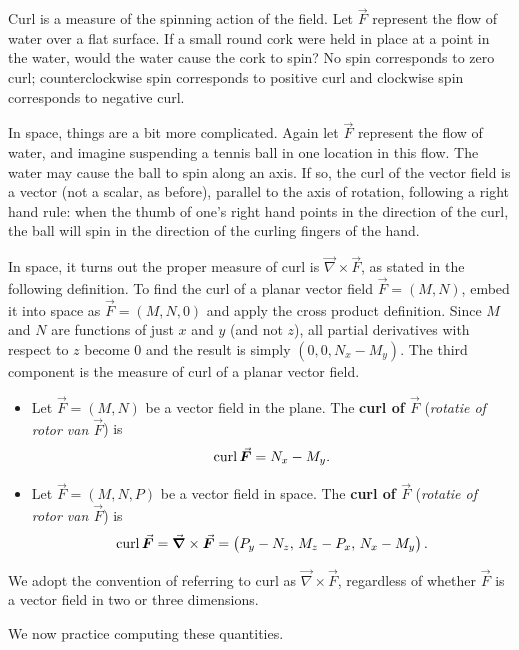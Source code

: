 Curl is a measure of the spinning action of the field. Let $\vec F$ represent the flow of water over a flat surface. If a small round cork were held in place at a point in the water, would the water cause the cork to spin? No spin corresponds to zero curl; counterclockwise spin corresponds to positive curl and clockwise spin corresponds to negative curl. 

In space, things are a bit more complicated. Again let $\vec F$ represent the flow of water, and imagine suspending a tennis ball in one location in this flow. The water may cause the ball to spin along an axis. If so, the curl of the vector field is a vector (not a scalar, as before), parallel to the axis of rotation, following a right hand rule: when the thumb of one's right hand points in the direction of the curl, the ball will spin in the direction of the curling fingers of the hand.

In space, it turns out the proper measure of curl is $\vec{\nabla} \times \vec F$, as stated in the following definition. To find the curl of a planar vector field $\vec F = \left( M,N\right)$, embed it into space as $\vec F = \left( M, N, 0\right)$ and apply the cross product definition. Since $M$ and $N$ are functions of just $x$ and $y$ (and not $z$), all partial derivatives with respect to $z$ become 0 and the result is simply $\left( 0,0,N_x-M_y\right)$. The third component is the measure of curl of a planar vector field. 

\begin{definition}[Curl]\label{def:curl}
\begin{itemize}
	\item Let $\vec F = \left( M,N\right)$ be a vector field in the plane. The \textbf{curl of $\vec F$} (\textit{rotatie of rotor van $\vec F$}) is $$\curl \vec F = N_x - M_y.$$
	\item Let $\vec F = \left( M,N,P\right)$ be a vector field in space. The \textbf{curl of $\vec F$} (\textit{rotatie of rotor van $\vec F$}) is $$\curl \vec F = \vec{\nabla} \times \vec F = \left( P_y-N_z,\,M_z-P_x,\,N_x - M_y\right).$$
\end{itemize}
\end{definition}

We adopt the convention of referring to curl as $\vec{\nabla} \times \vec F$, regardless of whether $\vec F$ is a vector field in two or three dimensions. 

We now practice computing these quantities.

